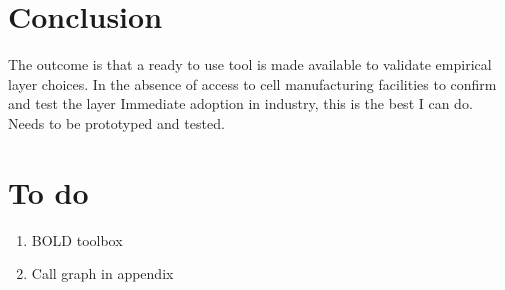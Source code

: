 \section{Conclusion}

The outcome is that a ready to  use tool is made available to validate empirical
layer choices.  In the  absence of  access to  cell manufacturing  facilities to
confirm and test the  layer Immediate adoption in industry, this  is the best I
can do. Needs to be prototyped and tested.


\section{To do}
\begin{enumerate}
    \item BOLD toolbox
    \item Call graph in appendix
\end{enumerate}

